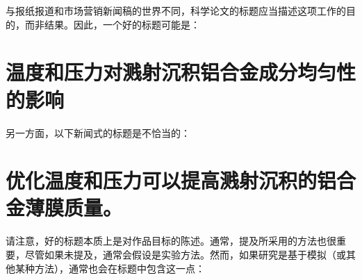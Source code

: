与报纸报道和市场营销新闻稿的世界不同，科学论文的标题应当描述这项工作的目的，而非结果。因此，一个好的标题可能是：

\section*{温度和压力对溅射沉积铝合金成分均匀性的影响}
另一方面，以下新闻式的标题是不恰当的：

\section*{优化温度和压力可以提高溅射沉积的铝合金薄膜质量。}
请注意，好的标题本质上是对作品目标的陈述。通常，提及所采用的方法也很重要，尽管如果未提及，通常会假设是实验方法。然而，如果研究是基于模拟（或其他某种方法），通常也会在标题中包含这一点：

